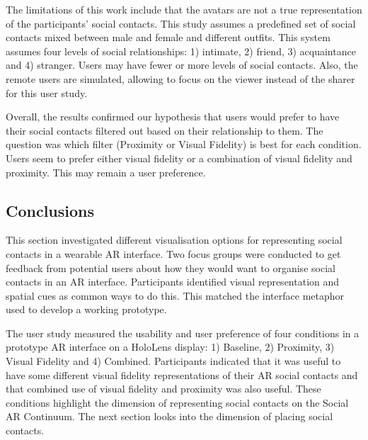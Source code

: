 The limitations of this work include that the avatars are not a true representation of the participants' social contacts. This study assumes a predefined set of social contacts mixed between male and female and different outfits. This system assumes four levels of social relationships: 1) intimate, 2) friend, 3) acquaintance and 4) stranger. Users may have fewer or more levels of social contacts. Also, the remote users are simulated, allowing to focus on the viewer instead of the sharer for this user study.

Overall, the results confirmed our hypothesis that users would prefer to have their social contacts filtered out based on their relationship to them. The question was which filter (Proximity or Visual Fidelity) is best for each condition. Users seem to prefer either visual fidelity or a combination of visual fidelity and proximity. This may remain a user preference. 


\subsection{Conclusions}

This section investigated different visualisation options for representing social contacts in a wearable AR interface. Two focus groups were conducted to get feedback from potential users about how they would want to organise social contacts in an AR interface. Participants identified visual representation and spatial cues as common ways to do this. This matched the interface metaphor used to develop a working prototype.

The user study measured the usability and user preference of four conditions in a prototype AR interface on a HoloLens display: 1) Baseline, 2) Proximity, 3) Visual Fidelity and 4) Combined. Participants indicated that it was useful to have some different visual fidelity representations of their AR social contacts and that combined use of visual fidelity and proximity was also useful. These conditions highlight the dimension of representing social contacts on the Social AR Continuum. The next section looks into the dimension of placing social contacts. 

